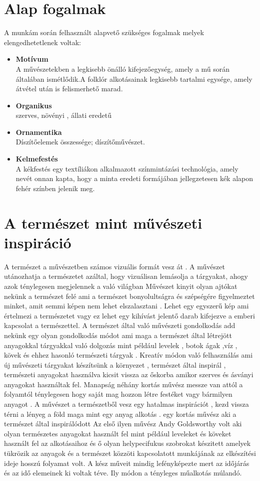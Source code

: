 \documentclass[fontsize=12pt, appendixprefix=true]{scrreprt}
\begin{document}
\section{Alap fogalmak}
A munkám során felhasznált  alapvető szükséges fogalmak melyek elengedhetetlenek voltak:
\begin{itemize}
	\item \textbf{Motívum} \\  A művészetekben a legkisebb önálló kifejezőegység, amely a mű során általában ismétlődik.A folklór alkotásainak legkisebb tartalmi egysége, amely átvétel után is felismerhető marad.
	\item \textbf{Organikus} \\ szerves, növényi , állati eredetű
	\item \textbf{Ornamentika} \\ Díszítőelemek összessége; díszítőművészet.
	\item \textbf{Kelmefestés} \\ A kékfestés egy textíliákon alkalmazott színmintázási technológia, amely nevét onnan kapta, hogy a minta eredeti formájában jellegzetesen kék alapon fehér színben jelenik meg.
	\end{itemize}

\section{A természet mint művészeti inspiráció}
A  természet a művészetben számos vizuális formát vesz át .
A művészet utánozhatja a természetet azáltal, hogy vizuálisan lemásolja a tárgyakat, ahogy azok ténylegesen megjelennek a való  világban 
Művészet kinyit olyan ajtókat nekünk a természet felé ami a természet  bonyolultságra  és szépségére figyelmeztet minket,
amit semmi képen nem lehet elszalasztani .
Lehet egy egyszerű kép ami értelmezi a természetet vagy ez lehet egy kihívást jelentő darab kifejezve a  emberi kapcsolat a természettel.
A természet által való művészeti gondolkodás add nekünk egy olyan gondolkodás módot  ami maga a természet által létrejött anyagokkal tárgyakkal való dolgozás  mint például levelek , botok ágak ,víz , kövek és ehhez hasonló természeti tárgyak .
Kreatív módon való felhasználás ami új művészeti tárgyakat készítsünk a környezet , természet  által inspirál ,
természeti anyagokat használva kicsit vissza az őskorba amikor szerves és ásványi anyagokat használtak fel.
Manapság néhány kortás művész messze van attól a folyamtól ténylegesen hogy saját mag hozzon létre festéket vagy bármilyen anyagot .
A művészet a természetből vesz egy hatalmas inspirációt , kezd vissza térni a lényeg a föld maga mint egy anyag alkotás .
egy  kortás művész aki a természet által inspirálódott 
Az első ilyen művész  Andy Goldsworthy  volt aki olyan természetes anyagokat használt fel mint például leveleket és köveket használt fel az alkotásaihoz és ő olyan helypecifukus szobrokat készitett amelyek tükrözik az anyagok és a természet közzöti kapcsolatott
munkájának az elkészítési ideje hosszú folyamat volt.
A kész műveit mindig lefényképezte mert  az időjárás és az idő elemeinek ki voltak téve.
 Ily módon a tényleges műalkotás múlandó.
\end{document}
